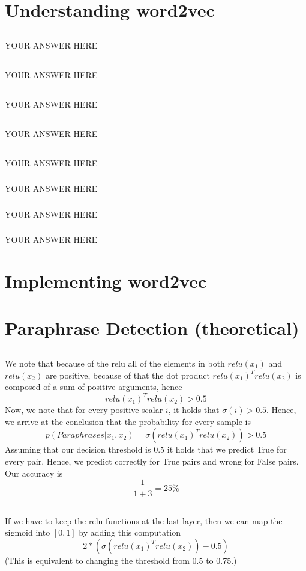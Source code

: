 \documentclass{article}
\begin{document}
\section{Understanding word2vec}
\subsection{}
YOUR ANSWER HERE
\subsection{}
YOUR ANSWER HERE
\subsection{}
YOUR ANSWER HERE
\subsection{}
YOUR ANSWER HERE
\subsection{}
YOUR ANSWER HERE
\subsubsection{}
YOUR ANSWER HERE
\subsubsection{}
YOUR ANSWER HERE
\subsubsection{}
YOUR ANSWER HERE
\section{Implementing word2vec}
\setcounter{subsection}{4}
\section{Paraphrase Detection (theoretical)}
\subsection{}
We note that because of the relu all of the elements in both $relu(x_1)$ and $relu(x_2)$ are positive, 
because of that the dot product $relu(x_1)^T relu(x_2)$ is composed of a sum of positive arguments, hence 
$$relu(x_1)^T relu(x_2) > 0.5$$
Now, we note that for every positive scalar $i$, it holds that $\sigma (i) > 0.5$. Hence, we arrive at the conclusion that the probability for every sample is
$$p(Paraphrases|x_1, x_2) = \sigma (relu(x_1)^T relu(x_2)) > 0.5$$
Assuming that our decision threshold is $0.5$ it holds that we predict True for every pair.
Hence, we predict correctly for True pairs and wrong for False pairs. Our accuracy is 
$$\frac{1}{1+3}=25 \% $$
\subsection{}
If we have to keep the relu functions at the last layer, then we can map the sigmoid into $[0,1]$ by adding this computation
$$2*(\sigma (relu(x_1)^T relu(x_2)) - 0.5)$$
(This is equivalent to changing the threshold from 0.5 to 0.75.)
\end{document}
